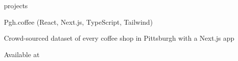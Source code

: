\documentclass{resume} %
\begin{document}
 \begin{rSection}
 {projects
 }

   \begin{rSubsection}{Pgh.coffee {\normalfont (React, Next.js, TypeScript, Tailwind)}}{}{}{}
   \item Crowd-sourced dataset of every coffee shop in Pittsburgh with a Next.js app
   \item Available at \href{https://pgh.coffee/}{} \textbar \ \href{https://github.com/Johngeorgesample/pgh-coffee}{}
   \end{rSubsection}





\end{rSection}
\end{document}
